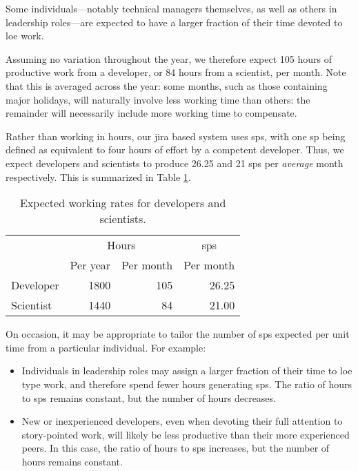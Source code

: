 Some individuals---notably technical managers themselves, as well as
others in leadership roles---are expected to have a larger fraction of
their time devoted to \gls{loe} work.

Assuming no variation throughout the year, we therefore expect 105 hours
of productive work from a developer, or 84 hours from a scientist, per
month. Note that this is averaged across the year: some months, such as
those containing major holidays, will naturally involve less working
time than others: the remainder will necessarily include more working
time to compensate.

Rather than working in hours, our \gls{jira} based system uses \glspl{sp}, with one \gls{sp} being defined as equivalent to four hours of effort by a competent developer.
Thus, we expect developers and scientists to produce 26.25 and 21 \glspl{sp} per \emph{average} month respectively.
This is summarized in Table \ref{tab:working-rate}.

\begin{table}
\begin{longtable}[]{@{}lrrr@{}}
\hline
          & \multicolumn{2}{c}{Hours} & \multicolumn{1}{c}{\glspl{sp}} \\
          & Per year & Per month      & Per month \\
\hline
Developer & 1800     & 105            & 26.25 \\
Scientist & 1440     &  84            & 21.00 \\
\hline
\end{longtable}
\caption{Expected working rates for developers and scientists.}
\label{tab:working-rate}
\end{table}

On occasion, it may be appropriate to tailor the number of \glspl{sp} expected per unit time from a particular individual.
For example:

\begin{itemize}
\item
  Individuals in leadership roles may assign a larger fraction of their time to \gls{loe} type work, and therefore spend fewer hours generating \glspl{sp}.
  The ratio of hours to \glspl{sp} remains constant, but the number of hours decreases.
\item
  New or inexperienced developers, even when devoting their full attention to story-pointed work, will likely be less productive than their more experienced peers.
  In this case, the ratio of hours to \glspl{sp} increases, but the number of hours remains constant.
\end{itemize}

